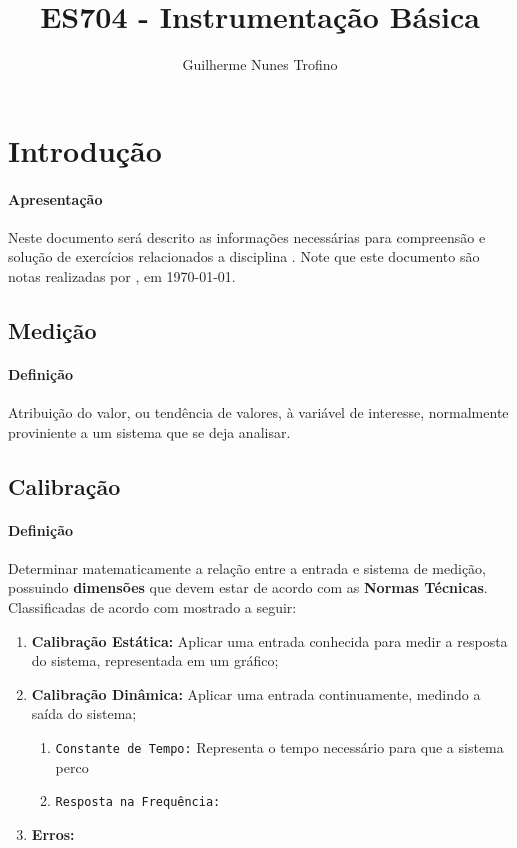 \documentclass{article}
\title{ES704 - Instrumentação Básica}
\author{Guilherme Nunes Trofino}
\begin{document}
    \maketitle
\newpage

    \tableofcontents
\newpage

    \section{Introdução}
        \paragraph{Apresentação}Neste documento será descrito as informações necessárias para compreensão e solução de exercícios relacionados a disciplina \thetitle. Note que este documento são notas realizadas por \theauthor, em \today.

    \subsection{Medição}
        \paragraph{Definição}Atribuição do valor, ou tendência de valores, à variável de interesse, normalmente proviniente a um sistema que se deja analisar.

    \subsection{Calibração}
        \paragraph{Definição}Determinar matematicamente a relação entre a entrada e sistema de medição, possuindo \textbf{dimensões} que devem estar de acordo com as \textbf{Normas Técnicas}. Classificadas de acordo com mostrado a seguir:
            \begin{enumerate}[rightmargin = \leftmargin]
                \item \textbf{Calibração Estática:} Aplicar uma entrada conhecida para medir a resposta do sistema, representada em um gráfico;

                \item \textbf{Calibração Dinâmica:} Aplicar uma entrada continuamente, medindo a saída do sistema;
                    \begin{enumerate}[noitemsep, rightmargin = \leftmargin]
                        \item \texttt{Constante de Tempo:} Representa o tempo necessário para que a sistema perco

                        \item \texttt{Resposta na Frequência:} 
                    \end{enumerate}

               \item \textbf{Erros:}
                    
            \end{enumerate}
\end{document}
